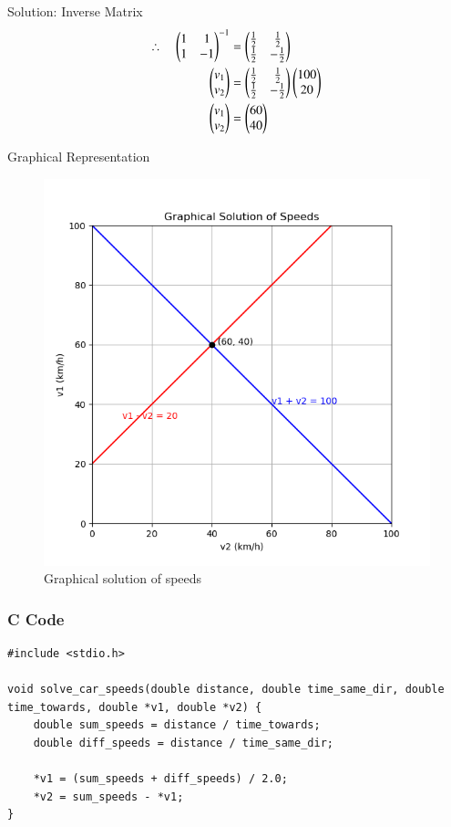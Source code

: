 \documentclass{beamer}
\begin{document}
\begin{frame}{Solution: Inverse Matrix}
\begin{align}
\therefore \quad 
\begin{pmatrix}1 & 1 \\ 1 & -1\end{pmatrix}^{-1} &= \begin{pmatrix}\frac{1}{2} & \frac{1}{2} \\ \frac{1}{2} & -\frac{1}{2}\end{pmatrix} \\
\begin{pmatrix}v_1 \\ v_2\end{pmatrix} &= \begin{pmatrix}\frac{1}{2} & \frac{1}{2} \\ \frac{1}{2} & -\frac{1}{2}\end{pmatrix} \begin{pmatrix}100 \\ 20\end{pmatrix} \\
\begin{pmatrix}v_1 \\ v_2\end{pmatrix} &= \begin{pmatrix}60 \\ 40\end{pmatrix}
\end{align}
\end{frame}

\begin{frame}{Graphical Representation}
\begin{figure}[ht!]
\centering
\includegraphics[height=0.6\textheight, keepaspectratio]{figs/speed.png}
\caption{Graphical solution of speeds}
\end{figure}
\end{frame}

\begin{frame}[fragile]
    \frametitle{C Code}
\begin{lstlisting}
#include <stdio.h>

void solve_car_speeds(double distance, double time_same_dir, double time_towards, double *v1, double *v2) {
    double sum_speeds = distance / time_towards;
    double diff_speeds = distance / time_same_dir;

    *v1 = (sum_speeds + diff_speeds) / 2.0;
    *v2 = sum_speeds - *v1;
}

\end{lstlisting}
\end{frame}
\end{document}

